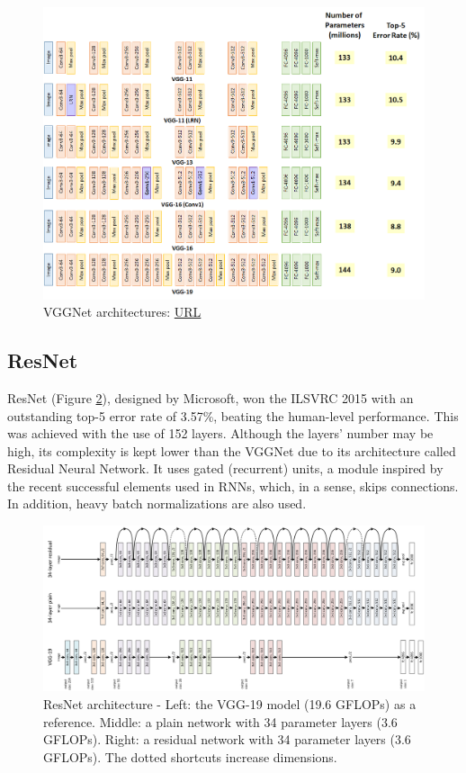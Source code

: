 \begin{figure} [H]
	\centering
	\includegraphics[width=\textwidth]{Images/CNNArchitectures/VGGNet.png}
	\decoRule
	\caption[VGGNet architectures]{VGGNet architectures: \href{https://medium.com/coinmonks/paper-review-of-vggnet-1st-runner-up-of-ilsvlc-2014-image-classification-d02355543a11}{URL}}
	\label{fig:VGGNet}
\end{figure}

\subsection{ResNet}
ResNet \cite{Deep-Residual-Learning-for-Image-Recognition} (Figure \ref{fig:ResNet}), designed by Microsoft, won the ILSVRC 2015 with an outstanding top-5 error rate of 3.57\%, beating the human-level performance. This was achieved with the use of 152 layers. Although the layers' number may be high, its complexity is kept lower than the VGGNet due to its architecture called Residual Neural Network. It uses gated (recurrent) units, a module inspired by the recent successful elements used in RNNs, which, in a sense, skips connections. In addition, heavy batch normalizations are also used.

\begin{figure} [H]
	\centering
	\includegraphics[width=\textwidth]{Images/CNNArchitectures/ResNet.png}
	\decoRule
	\caption[ResNet architecture]{ResNet architecture - Left: the VGG-19 model (19.6 GFLOPs) as a reference. Middle: a plain network with 34 parameter layers (3.6 GFLOPs). Right: a residual network with 34 parameter layers (3.6 GFLOPs). The dotted shortcuts increase dimensions.}
	\label{fig:ResNet}
\end{figure}

